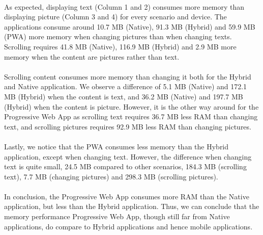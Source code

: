 \documentclass{kththesis}
\begin{document}
\paragraph{}
As expected, displaying text (Column 1 and 2) consumes more memory than displaying picture (Column 3 and 4) for every scenario and device. The applications consume around 10.7 MB (Native), 91.3 MB (Hybrid) and 59.9 MB (PWA) more memory when changing pictures than when changing texts. Scrolling requires 41.8 MB (Native), 116.9 MB (Hybrid) and 2.9 MB more memory when the content are pictures rather than text. 

\paragraph{}
Scrolling content consumes more memory than changing it both for the Hybrid and Native application. We observe a difference of 5.1 MB (Native) and 172.1 MB (Hybrid) when the content is text, and 36.2 MB (Native) and 197.7 MB (Hybrid) when the content is picture. However, it is the other way around for the Progressive Web App as scrolling text requires 36.7 MB less RAM than changing text, and scrolling pictures requires 92.9 MB less RAM than changing pictures.

\paragraph{}
Lastly, we notice that the PWA consumes less memory than the Hybrid application, except when changing text. However, the difference when changing text is quite small, 24.5 MB compared to other scenarios, 184.3 MB (scrolling text), 7.7 MB (changing pictures) and 298.3 MB (scrolling pictures). 

\paragraph{}
In conclusion, the Progressive Web App consumes more RAM than the Native application, but less than the Hybrid application. Thus, we can conclude that the memory performance Progressive Web App, though still far from Native applications, do compare to Hybrid applications and hence mobile applications. 
\end{document}
